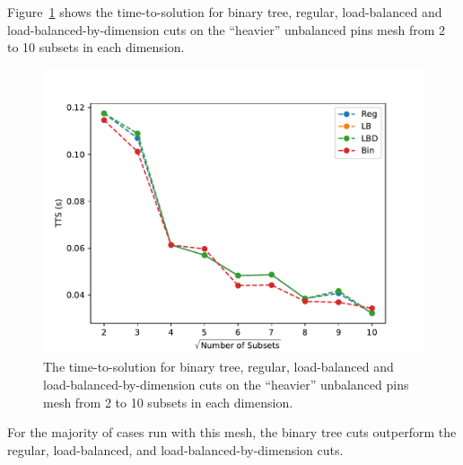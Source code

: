 Figure~\ref{ubp_opt_heavy} shows the time-to-solution for binary tree, regular, load-balanced and load-balanced-by-dimension cuts on the ``heavier'' unbalanced pins mesh from 2 to 10 subsets in each dimension.
\begin{figure}[h]
\centering
\includegraphics{../../figures/more_sparse_best_comp.pdf}
  \caption{The time-to-solution for binary tree, regular, load-balanced and load-balanced-by-dimension cuts on the ``heavier'' unbalanced pins mesh from 2 to 10 subsets in each dimension.}
  \label{ubp_opt_heavy}
\end{figure}
For the majority of cases run with this mesh, the binary tree cuts outperform the regular, load-balanced, and load-balanced-by-dimension cuts.

